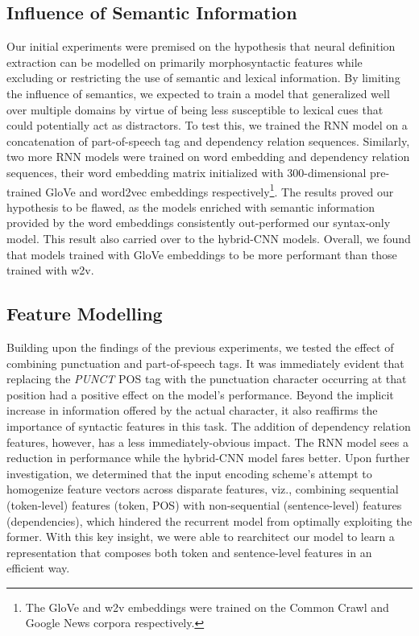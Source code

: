 \documentclass[11pt]{article}
\begin{document}
\subsection{Influence of Semantic Information}
Our initial experiments were premised on the hypothesis that neural definition extraction can be modelled on primarily
morphosyntactic features while excluding or restricting the use of semantic and lexical information. By limiting the influence
of semantics, we expected to train a model that generalized well over multiple domains by virtue of being less susceptible to
lexical cues that could potentially act as distractors. To test this, we trained the RNN model on a concatenation of
part-of-speech tag and dependency relation sequences. Similarly, two more RNN models were trained on word embedding and dependency
relation sequences, their word embedding matrix initialized with 300-dimensional pre-trained GloVe \cite{pennington2014glove} and
word2vec \cite{mikolov2013efficient} embeddings respectively\footnote{The GloVe and w2v embeddings were trained on the Common Crawl
and Google News corpora respectively.}. The results proved our hypothesis to be flawed, as the models enriched with semantic
information provided by the word embeddings consistently out-performed our syntax-only model. This result also carried over to the
hybrid-CNN models. Overall, we found that models trained with GloVe embeddings to be more performant than those trained with w2v.\\

\subsection{Feature Modelling}
Building upon the findings of the previous experiments, we tested the effect of combining punctuation and part-of-speech tags. It
was immediately evident that replacing the \emph{PUNCT} POS tag with the punctuation character occurring at that position had a
positive effect on the model's performance. Beyond the implicit increase in information offered by the actual character, it
also reaffirms the importance of syntactic features in this task. The addition of dependency relation features, however, has a less
immediately-obvious impact. The RNN model sees a reduction in performance while the hybrid-CNN model fares better. Upon further
investigation, we determined that the input encoding scheme's attempt to homogenize feature vectors across disparate features, viz.,
combining sequential (token-level) features (token, POS) with non-sequential (sentence-level) features (dependencies), which
hindered the recurrent model from optimally exploiting the former. With this key insight, we were able to rearchitect our model
to learn a representation that composes both token and sentence-level features in an efficient way.
\end{document}

